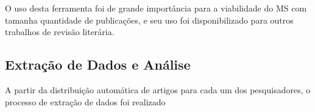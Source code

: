O uso desta ferramenta foi de grande importância para a viabilidade do MS com tamanha quantidade de publicações, e seu uso foi disponibilizado para outros trabalhos de revisão literária.

\subsection{Extração de Dados e Análise}


A partir da distribuição automática de artigos para cada um dos pesquisadores, o processo de extração de dados foi realizado


